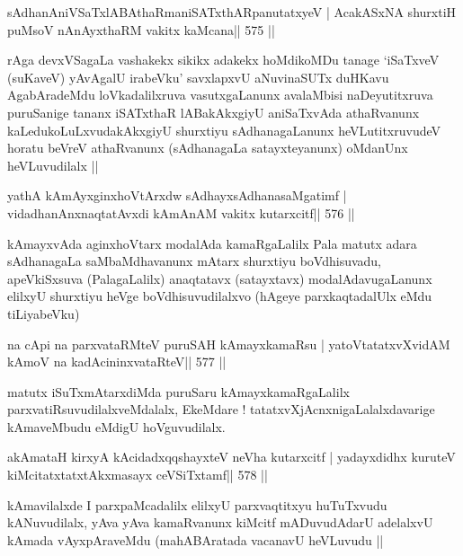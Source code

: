 \begin{shl}
sAdhanAniVSaTxlABAthaRmaniSATxthARpanutatxyeV |
AcakASxNA shurxtiH puMsoV nAnAyxthaRM vakitx kaMcana\hfill || 575 ||
\end{shl}

\begin{artha}
rAga devxVSagaLa vashakekx sikikx adakekx hoMdikoMDu tanage `iSaTxveV
(suKaveV) yAvAgalU irabeVku' savxlapxvU aNuvinaSUTx duHKavu
AgabAradeMdu loVkadalilxruva vasutxgaLanunx avalaMbisi naDeyutitxruva
puruSanige tananx iSATxthaR lABakAkxgiyU aniSaTxvAda athaRvanunx
kaLedukoLuLxvudakAkxgiyU shurxtiyu sAdhanagaLanunx heVLutitxruvudeV
horatu beVreV athaRvanunx (sAdhanagaLa satayxteyanunx) oMdanUnx
heVLuvudilalx ||
\end{artha}



\begin{shl}
yathA kAmAyxginxhoVtArxdw sAdhayxsAdhanasaMgatimf |
vidadhanAnxnaqtatAvxdi kAmAnAM vakitx kutarxcitf\hfill || 576 ||
\end{shl}

\begin{artha}
kAmayxvAda aginxhoVtarx modalAda kamaRgaLalilx Pala matutx adara
sAdhanagaLa saMbaMdhavanunx mAtarx shurxtiyu boVdhisuvadu,
apeVkiSxsuva (PalagaLalilx) anaqtatavx (satayxtavx) modalAdavugaLanunx
elilxyU shurxtiyu heVge boVdhisuvudilalxvo (hAgeye parxkaqtadalUlx
eMdu tiLiyabeVku)
\end{artha}

\begin{shl}
na cApi na parxvataRMteV puruSAH kAmayxkamaRsu |
yatoV\s tatatxvXvidAM kAmoV na kadAcininxvataRteV\hfill || 577 ||
\end{shl}

\begin{artha}
matutx iSuTxmAtarxdiMda puruSaru kAmayxkamaRgaLalilx parxvatiRsuvudilalxveMdalalx, EkeMdare ! tatatxvXjAcnxnigaLalalxdavarige kAmaveMbudu eMdigU hoVguvudilalx.
\end{artha}

\begin{shl}
akAmataH kirxyA kAcidadxqqshayxteV neVha kutarxcitf |
yadayxdidhx kuruteV kiMcitatxtatxtAkxmasayx ceVSiTxtamf\hfill || 578 ||
\end{shl}

\begin{artha}
kAmavilalxde I parxpaMcadalilx elilxyU parxvaqtitxyu huTuTxvudu
kANuvudilalx, yAva yAva kamaRvanunx kiMcitf mADuvudAdarU adelalxvU
kAmada vAyxpAraveMdu (mahABAratada vacanavU heVLuvudu || 
\end{artha}

